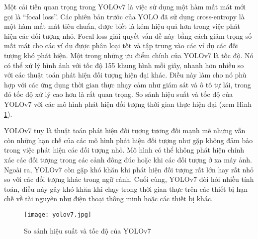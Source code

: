 \documentclass[../the.tex]{subfiles}
\begin{document}
{\fontsize{13}{12} \selectfont

	Một cải tiến quan trọng trong YOLOv7 là việc sử dụng một hàm mất mát mới gọi là “focal loss”. Các phiên bản trước của YOLO đã sử dụng cross-entropy là một hàm mất mát tiêu chuẩn, được biết là kém hiệu quả hơn trong việc phát hiện các đối tượng nhỏ. Focal loss giải quyết vấn đề này bằng cách giảm trọng số mất mát cho các ví dụ được phân loại tốt và tập trung vào các ví dụ các đối tượng khó phát hiện.
	Một trong những ưu điểm chính của YOLOv7 là tốc độ. Nó có thể xử lý hình ảnh với tốc độ 155 khung hình mỗi giây, nhanh hơn nhiều so với các thuật toán phát hiện đối tượng hiện đại khác. Điều này làm cho nó phù hợp với các ứng dụng thời gian thực nhạy cảm như giám sát và ô tô tự lái, trong đó tốc độ xử lý cao hơn là rất quan trọng.
	So sánh hiệu suất và tốc độ của YOLOv7 với các mô hình phát hiện đối tượng thời gian thực hiện đại (xem Hình \ref{fig:yolov7}).

}

\bigskip

{\fontsize{13}{12} \selectfont

	YOLOv7 tuy là thuật toán phát hiện đối tượng tương đối mạnh mẽ nhưng vẫn còn những hạn chế của các mô hình phát hiện đối tượng như gặp không đảm bảo trong việc phát hiện các đối tượng nhỏ. Mô hình có thể không phát hiện chính xác các đối tượng trong các cảnh đông đúc hoặc khi các đối tượng ở xa máy ảnh.
	Ngoài ra, YOLOv7 còn gặp khó khăn khi phát hiện đối tượng rất lớn hay rất nhỏ so với các đối tượng khác trong ngữ cảnh. Cuối cùng, YOLOv7 đòi hỏi nhiều tính toán, điều này gây khó khăn khi chạy trong thời gian thực trên các thiết bị hạn chế về tài nguyên như điện thoại thông minh hoặc các thiết bị
	khác.

}

\begin{figure}[H]
	\centering
	\texttt{[image: yolov7.jpg]}
	\caption{So sánh hiệu suất và tốc độ của YOLOv7 \cite{wang2022yolov7}}
	\label{fig:yolov7}
\end{figure}
\end{document}
